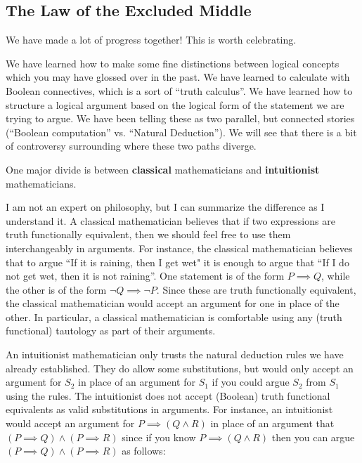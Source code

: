  
\subsection{The Law of the Excluded Middle }

We have made a lot of progress together!  This is worth celebrating.

We have learned how to make some fine distinctions between logical concepts which you may have glossed over in the past.  We have learned to calculate with Boolean connectives, which is a sort of ``truth calculus''.  We have learned how to structure a logical argument based on the logical form of the statement we are trying to argue.  We have been telling these as two parallel, but connected stories (``Boolean computation'' vs. ``Natural Deduction'').  We will see that there is a bit of controversy surrounding where these two paths diverge.

One major divide is between \textbf{classical} mathematicians and \textbf{intuitionist} mathematicians.

I am not an expert on philosophy, but I can summarize the difference as I understand it.  A classical mathematician believes that if two expressions are truth functionally equivalent, then we should feel free to use them interchangeably in arguments.  For instance, the classical mathematician believes that to argue ``If it is raining, then I get wet" it is enough to argue that ``If I do not get wet, then it is not raining''.  One statement is of the form $P \implies Q$, while the other is of the form $\neg Q \implies \neg P$.  Since these are truth functionally equivalent, the classical mathematician would accept an argument for one in place of the other.  In particular, a classical mathematician is comfortable using any (truth functional) tautology as part of their arguments.

An intuitionist mathematician only trusts the natural deduction rules we have already established.  They do allow some substitutions, but would only accept an argument for $S_2$ in place of an argument for $S_1$ if you could argue $S_2$ from $S_1$ using the rules.   The intuitionist does not accept (Boolean) truth functional equivalents as valid substitutions in arguments.  For instance, an intuitionist would accept an argument for $P \implies (Q \wedge R)$ in place of an argument that $(P \implies Q) \wedge (P \implies R)$ since if you know  $P \implies (Q \wedge R)$ then you can argue $(P \implies Q) \wedge (P \implies R)$ as follows:

